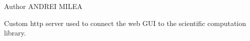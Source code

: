 \begin{DoxyAuthor}{Author}
A\-N\-D\-R\-E\-I M\-I\-L\-E\-A
\end{DoxyAuthor}
Custom http server used to connect the web G\-U\-I to the scientific computation library. 